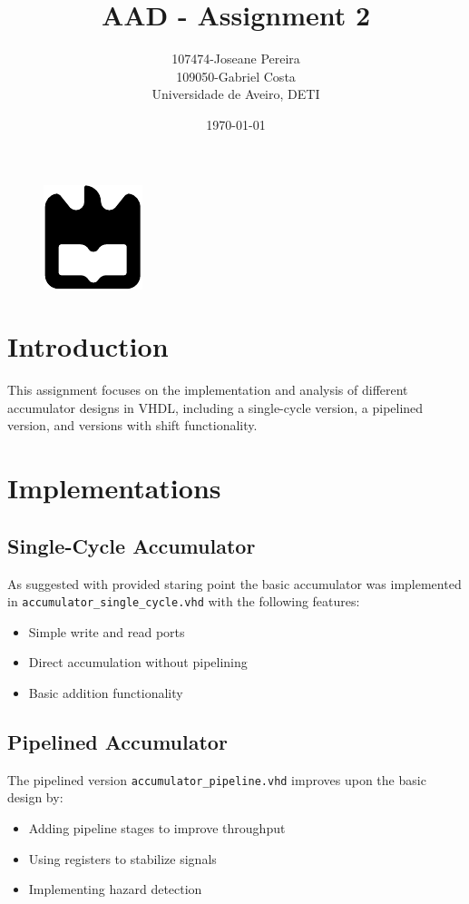 \documentclass[a4paper,12pt]{article}
\title{AAD - Assignment 2}
\author{107474-Joseane Pereira \\
109050-Gabriel Costa \\
Universidade de Aveiro, DETI}
\date{\today}
\begin{document}
\begin{figure}
    \centering
    \includegraphics[width=0.3\linewidth]{ua.pdf}
    \label{fig:enter-label}
\end{figure}
\maketitle
\newpage
\tableofcontents
\newpage
\section{Introduction}
This assignment focuses on the implementation and analysis of different 
accumulator designs in VHDL, including a single-cycle version, a pipelined 
version, and versions with shift functionality.


\section{Implementations}
\subsection{Single-Cycle Accumulator}
As suggested with provided staring point the basic accumulator was implemented in
\texttt{accumulator\_single\_cycle.vhd} with the following features:
\begin{itemize}
    \item Simple write and read ports
    \item Direct accumulation without pipelining
    \item Basic addition functionality
\end{itemize}

\subsection{Pipelined Accumulator}
The pipelined version \texttt{accumulator\_pipeline.vhd} improves
 upon the basic design by:
\begin{itemize}
    \item Adding pipeline stages to improve throughput
    \item Using registers to stabilize signals
    \item Implementing hazard detection
\end{itemize}
\end{document}
